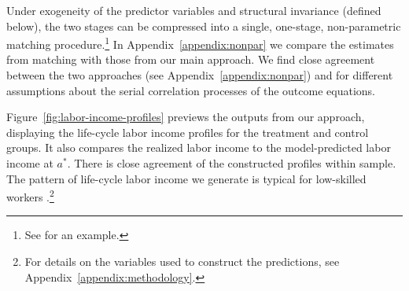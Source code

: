 Under exogeneity of the predictor variables and structural invariance (defined below), the two stages can be compressed into a single, one-stage, non-parametric matching procedure.\footnote{See \citet{Heckman_Ichimura_etal_1998_Econometrica} for an example.} In  Appendix~\ref{appendix:nonpar} we compare the estimates from matching with those from our main approach. We find close agreement between the two approaches (see  Appendix~\ref{appendix:nonpar}) and for different assumptions about the serial correlation processes of the outcome equations.

Figure~\ref{fig:labor-income-profiles} previews the outputs from our approach, displaying the life-cycle labor income profiles for the treatment and control groups. It also compares the realized labor income to the model-predicted labor income at $a^*$. There is close agreement of the constructed profiles within sample. The pattern of life-cycle labor income we generate is typical for low-skilled workers \citep{Blundell-etal_2015_J-Pub-E,Gladden_Taber_2000_WageProgression,Sanders-Taber_2012_AR,Lagakos_Moll_etal_2016_LifeCycle_NBER}.\footnote{For details on the variables used to construct the predictions, see  Appendix~\ref{appendix:methodology}.}

